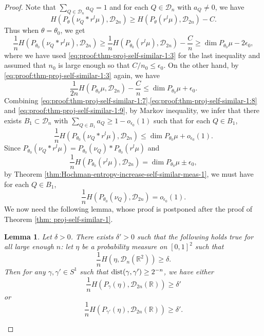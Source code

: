 \documentclass[a4paper,11pt]{amsart}
\newtheorem{lemma}[theorem]{Lemma}
\theoremstyle{definition}
\numberwithin{equation}{section}
\def\D{\mathcal{D}}
\def\R{\mathbb R}
\DeclareMathOperator{\dist}{{\rm dist}}
\begin{document}
\begin{proof}
Note that $\sum_{Q\in \D_n}a_Q=1$ and for each $Q\in \D_n$ with $a_Q\neq 0$, we have
\[
H(P_\theta(\nu_Q*r^l\mu),\D_{2n})\ge H(P_\theta(r^l\mu),\D_{2n})-C.
\]
Thus when $\theta=\theta_0$, we get
\begin{equation}\label{eq:proof:thm-proj-self-similar-1:8}
\frac{1}{n}H(P_{\theta_0}(\nu_Q*r^l\mu),\D_{2n})\ge \frac{1}{n}H(P_{\theta_0}(r^l\mu),\D_{2n})-\frac{C}{n}\ge \dim P_{\theta_0}\mu-2\epsilon_0,
\end{equation}
where we have used \eqref{eq:proof:thm-proj-self-similar-1:3} for the last inequality and assumed that  $n_0$ is large enough so that $C/n_0\le \epsilon_0$.
On the other hand, by \eqref{eq:proof:thm-proj-self-similar-1:3} again, we have 
\begin{equation}\label{eq:proof:thm-proj-self-similar-1:9}
 \frac{1}{2n}H(P_{\theta_0}\mu,\D_{2n})-\frac{C}{n}\le \dim P_{\theta_0}\mu+\epsilon_0.
\end{equation}
Combining \eqref{eq:proof:thm-proj-self-similar-1:7},\eqref{eq:proof:thm-proj-self-similar-1:8} and \eqref{eq:proof:thm-proj-self-similar-1:9}, by Markov inequality, we infer that there exists $B_1\subset \D_n$ with $\sum_{Q\in B_1}a_Q\ge 1-o_{\epsilon_0}(1)$ such that for each $Q\in B_1$,
\begin{equation}\label{eq:proof:thm-proj-self-similar-1:10}
\frac{1}{n}H(P_{\theta_0}(\nu_Q*r^l\mu),\D_{2n})\le \dim P_{\theta_0}\mu+o_{\epsilon_0}(1).
\end{equation}
Since $P_{\theta_0}(\nu_Q*r^l\mu)=P_{\theta_0}(\nu_Q)*P_{\theta_0}(r^l\mu)$ and 
\[
\frac{1}{n}H(P_{\theta_0}(r^l\mu),\D_{2n})=\dim P_{\theta_0}\mu\pm\epsilon_0,\]
by Theorem \ref{thm:Hochman-entropy-increase-self-similar-meas-1},  we must have for each $Q\in B_1$,
\begin{equation}\label{eq:proof:thm-proj-self-similar-1:10:1}
\frac{1}{n}H(P_{\theta_0}(\nu_Q), \D_{2n})=o_{\epsilon_0}(1).
\end{equation}
We now need the following lemma, whose proof is postponed after the proof of Theorem \ref{thm: proj-self-similar-1}.
\begin{lemma}\label{lemma:entropy-increase-in-two-directions-1}
Let $\delta>0$. There exists $\delta'>0$ such that the following holds true for all large enough $n$: let $\eta$ be a probability measure on $[0,1]^2$ such that 
\begin{equation}\label{eq:lemma-entropy-increase-in-two-directions-1:1}
\frac{1}{n}H(\eta,\D_n(\R^2))\ge \delta.
\end{equation}
Then for any $\gamma,\gamma'\in S^1$ such that $\dist(\gamma,\gamma')\ge 2^{-n}$,
we have either 
\[
\frac{1}{n}H(P_\gamma(\eta),\D_{2n}(\R))\ge \delta'
\]
or
\[
\frac{1}{n}H(P_{\gamma'}(\eta),\D_{2n}(\R))\ge \delta'.
\]
\end{lemma}


\end{proof}
\end{document}
